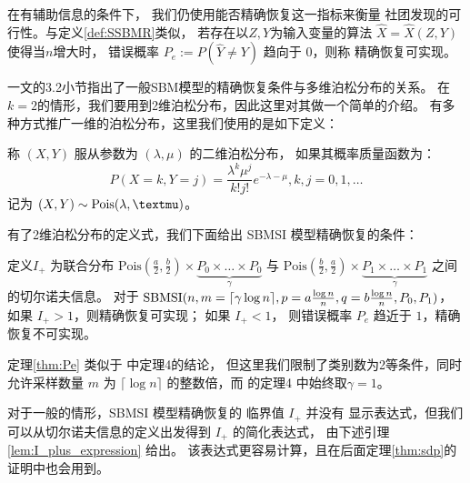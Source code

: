  在有辅助信息的条件下，
 我们仍使用能否精确恢复这一指标来衡量
 社团发现的可行性。与定义\ref{def:SSBMR}类似，
 若存在以$Z,Y$为输入变量的算法 $\hat{X}=\hat{X}(Z,Y)$
 使得当$n$增大时，
 错误概率
 $P_e:=P(\hat{Y} \neq Y)$ 趋向于 $0$，则称
 精确恢复可实现。

 \citet{abbe2015community}一文的3.2小节指出了一般SBM模型的精确恢复条件与多维泊松分布的关系。
在$k=2$的情形，我们要用到2维泊松分布，因此这里对其做一个简单的介绍。
有多种方式推广一维的泊松分布，这里我们使用的是如下定义：

\begin{definition}
    称 $(X,Y)$ 服从参数为 $(\lambda, \mu)$ 的二维泊松分布，
    如果其概率质量函数为：
    \begin{equation}
        P(X=k, Y=j) = \frac{\lambda^k \mu^j}{k! j!}
        e^{-\lambda - \mu}, k,j=0,1,\dots
    \end{equation}
    记为 $(X,Y) \sim \Pois(\lambda, \mu)$。
\end{definition}

有了2维泊松分布的定义式，我们下面给出
SBMSI 模型精确恢复的条件：
\begin{theorem}\label{thm:Pe}
    定义$I_+$ 为联合分布 $\textrm{Pois}(\frac{a}{2},\frac{b}{2})\times \underbrace{P_0 \times \dots \times P_0}_{\gamma}$
    与 $\textrm{Pois}(\frac{b}{2}, \frac{a}{2})\times \underbrace{P_1 \times \dots \times P_1}_{\gamma}$ 
    之间的切尔诺夫信息。    
    对于 $\operatorname{SBMSI}(n,m=\lceil \gamma \log n \rceil, p=a\frac{\log n}{n},q=b\frac{\log n}{n},P_0,P_1)$，
    如果 $I_+>1$，则精确恢复可实现；
    如果 $I_+ < 1$，
    则错误概率 $P_e$ 趋近于 $1$，精确恢复不可实现。
\end{theorem}

定理\ref{thm:Pe} 类似于 \citet{abbe17sideinfo} 中定理4的结论，
但这里我们限制了类别数为2等条件，同时允许采样数量 $m$ 为
$\lceil \log n \rceil $ 的整数倍，而 \citet{abbe17sideinfo} 的定理4
中始终取$\gamma=1$。

对于一般的情形，SBMSI 模型精确恢复的 临界值 $I_+$ 并没有
显示表达式，但我们可以从切尔诺夫信息的定义出发得到 $I_+$ 的简化表达式，
由下述引理 \ref{lem:I_plus_expression} 给出。
该表达式更容易计算，且在后面定理\ref{thm:sdp}的证明中也会用到。

